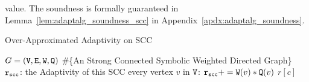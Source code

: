 value.%
The soundness is formally guaranteed in Lemma~\ref{lem:adaptalg_soundness_scc} in Appendix~\ref{apdx:adaptalg_soundness}.

        \begin{algorithm}
          \caption{
          {Over-Approximated Adaptivity on SCC}
          \label{alg:overadp_alg}
          }
          \begin{algorithmic}[1]
          \REQUIRE $G = (\mathtt{V}, \mathtt{E}, \mathtt{W}, \mathtt{Q})$ \#\{An Strong Connected Symbolic Weighted Directed Graph\}
          \\
          $\mathtt{r_{scc}}$: the Adaptivity of this SCC
           every vertex $v$ in $\mathtt{V}$:
          \STATE  \qquad $\mathtt{r_{scc}} += \mathtt{W}(v)*\mathtt{Q}(v)$  
          \RETURN $r[c]$
          \end{algorithmic}
          \end{algorithm}
